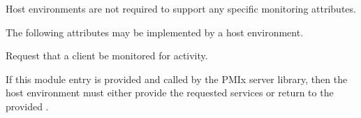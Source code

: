 
Host environments are not required to support any specific monitoring attributes.

\reqattrend

\optattrstart
The following attributes may be implemented by a  host environment.


\optattrend

\descr

Request that a client be monitored for activity.

\advicermstart
If this module entry is provided and called by the \ac{PMIx} server library, then the host environment must either provide the requested services or return  to the provided .
\advicermend
